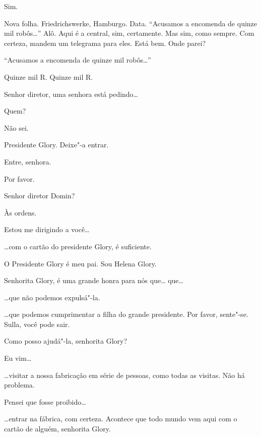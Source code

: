  Sim.

 Nova folha. Friedrichswerke, Hamburgo. Data. ``Acusamos a encomenda de
quinze mil robôs\ldots{}'' 
Alô. Aqui é a central, sim, certamente. Mas sim, como sempre. Com
certeza, mandem um telegrama para eles. Está bem. 
Onde parei?

 ``Acusamos a encomenda de quinze mil robôs\ldots{}''

  Quinze mil R. Quinze mil R.

  Senhor diretor, uma senhora está pedindo\ldots{}

 Quem?

 Não sei. 

  Presidente Glory. Deixe"-a entrar.

  Entre, senhora.

  Por favor.

 Senhor diretor Domin?

 Às ordens.

 Estou me dirigindo a você\ldots{}

 \ldots{}com o cartão do presidente Glory, é suficiente.

 O Presidente Glory é meu pai. Sou Helena Glory.

 Senhorita Glory, é uma grande honra para nós que\ldots{} que\ldots{}

 \ldots{}que não podemos expulsá"-la.

 \ldots{}que podemos cumprimentar a filha do grande presidente. Por favor,
sente"-se. Sulla, você pode sair.

  Como posso ajudá"-la, senhorita Glory?

 Eu vim\ldots{}

 \ldots{}visitar a nossa fabricação em série de pessoas, como todas as visitas.
Não há problema.

 Pensei que fosse proibido\ldots{}

 \ldots{}entrar na fábrica, com certeza. Acontece que todo mundo vem aqui com o
cartão de alguém, senhorita Glory.

